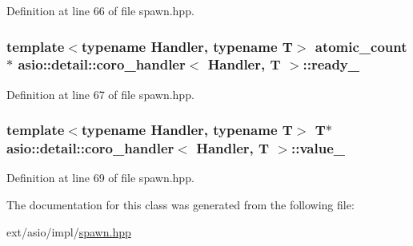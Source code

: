Definition at line 66 of file spawn.\+hpp.

\hypertarget{classasio_1_1detail_1_1coro__handler_af0de99911da9c638f145fd4cda8056a5}{}
\subsubsection[{ready\+\_\+}]{\setlength{\rightskip}{0pt plus 5cm}template$<$typename Handler, typename T$>$ {\bf atomic\+\_\+count}$\ast$ {\bf asio\+::detail\+::coro\+\_\+handler}$<$ Handler, T $>$\+::ready\+\_\+}\label{classasio_1_1detail_1_1coro__handler_af0de99911da9c638f145fd4cda8056a5}


Definition at line 67 of file spawn.\+hpp.

\hypertarget{classasio_1_1detail_1_1coro__handler_adec5b58707ea63ea81b7bbd808826cad}{}
\subsubsection[{value\+\_\+}]{\setlength{\rightskip}{0pt plus 5cm}template$<$typename Handler, typename T$>$ T$\ast$ {\bf asio\+::detail\+::coro\+\_\+handler}$<$ Handler, T $>$\+::value\+\_\+}\label{classasio_1_1detail_1_1coro__handler_adec5b58707ea63ea81b7bbd808826cad}


Definition at line 69 of file spawn.\+hpp.



The documentation for this class was generated from the following file\+:\begin{DoxyCompactItemize}
\item 
ext/asio/impl/\hyperlink{impl_2spawn_8hpp}{spawn.\+hpp}\end{DoxyCompactItemize}
